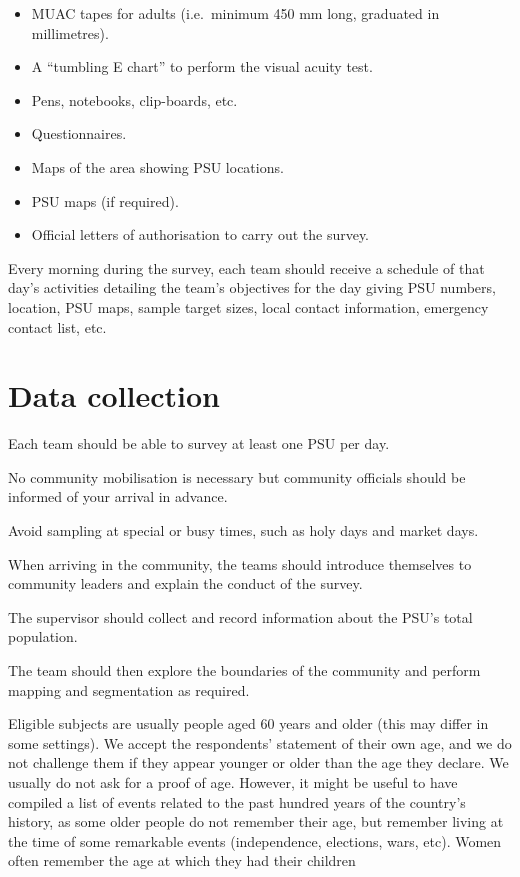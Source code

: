 \documentclass[12pt,a4paper]{book}
\providecommand{\tightlist}{%
  \setlength{\itemsep}{0pt}\setlength{\parskip}{0pt}}
\theoremstyle{definition}
\theoremstyle{definition}
\theoremstyle{definition}
\theoremstyle{remark}
\begin{document}
\begin{itemize}
\tightlist
\item
  MUAC tapes for adults (i.e.~minimum 450 mm long, graduated in
  millimetres).
\item
  A ``tumbling E chart'' to perform the visual acuity test.
\item
  Pens, notebooks, clip-boards, etc.
\item
  Questionnaires.
\item
  Maps of the area showing PSU locations.
\item
  PSU maps (if required).
\item
  Official letters of authorisation to carry out the survey.
\end{itemize}

Every morning during the survey, each team should receive a schedule of
that day's activities detailing the team's objectives for the day giving
PSU numbers, location, PSU maps, sample target sizes, local contact
information, emergency contact list, etc.

\hypertarget{data-collection}{%
\section{Data collection}\label{data-collection}}

Each team should be able to survey at least one PSU per day.

No community mobilisation is necessary but community officials should be
informed of your arrival in advance.

Avoid sampling at special or busy times, such as holy days and market
days.

When arriving in the community, the teams should introduce themselves to
community leaders and explain the conduct of the survey.

The supervisor should collect and record information about the PSU's
total population.

The team should then explore the boundaries of the community and perform
mapping and segmentation as required.

Eligible subjects are usually people aged 60 years and older (this may
differ in some settings). We accept the respondents' statement of their
own age, and we do not challenge them if they appear younger or older
than the age they declare. We usually do not ask for a proof of age.
However, it might be useful to have compiled a list of events related to
the past hundred years of the country's history, as some older people do
not remember their age, but remember living at the time of some
remarkable events (independence, elections, wars, etc). Women often
remember the age at which they had their children
\end{document}
